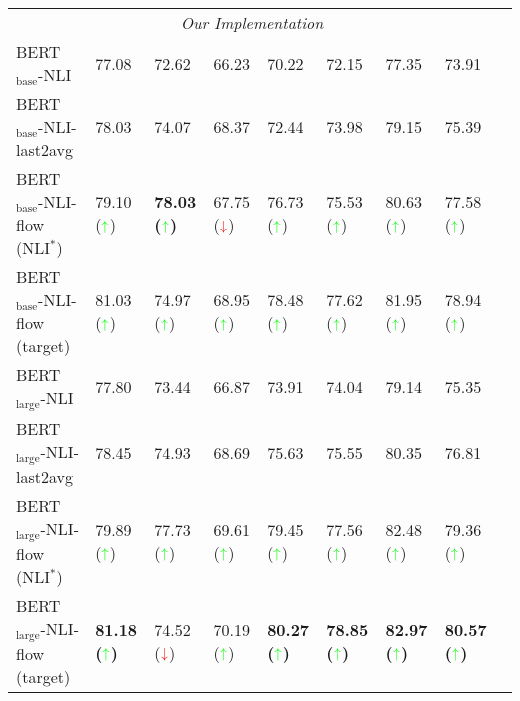 \documentclass[11pt,a4paper]{article}
\newcommand*{\mathcolor}{}
\def\mathcolor#1#{\mathcoloraux{#1}}
\newcommand*{\mathcoloraux}[3]{\protect\leavevmode
  \begingroup
    \color#1{#2}#3\endgroup
}
\begin{document}
\begin{table*}[ht]
\begin{center}
{\begin{tabular}{l llllllll}
\midrule\midrule
\multicolumn{8}{c}{\emph{Our Implementation}}  \\
BERT$_{\text{base}}$-NLI  & 77.08	& 72.62	& 66.23	& 70.22	& 72.15	& 77.35	& 73.91 \\
BERT$_{\text{base}}$-NLI-last2avg & 78.03	& 74.07	& 68.37	& 72.44	& 73.98	& 79.15	& 75.39 \\
BERT$_{\text{base}}$-NLI-flow (NLI$^*$)   & 79.10 ($\mathcolor{green}{\uparrow}$)	& \bf 78.03 ($\mathcolor{green}{\uparrow}$)	& 67.75 ($\mathcolor{red}{\downarrow}$)	& 76.73 ($\mathcolor{green}{\uparrow}$)	& 75.53 ($\mathcolor{green}{\uparrow}$)	& 80.63 ($\mathcolor{green}{\uparrow}$)	& 77.58 ($\mathcolor{green}{\uparrow}$) \\
BERT$_{\text{base}}$-NLI-flow (target) & 81.03 ($\mathcolor{green}{\uparrow}$)	& 74.97 ($\mathcolor{green}{\uparrow}$)	& 68.95 ($\mathcolor{green}{\uparrow}$)	& 78.48 ($\mathcolor{green}{\uparrow}$)	& 77.62 ($\mathcolor{green}{\uparrow}$)	& 81.95 ($\mathcolor{green}{\uparrow}$)	& 78.94 ($\mathcolor{green}{\uparrow}$) \\
\midrule
BERT$_{\text{large}}$-NLI & 77.80	& 73.44	& 66.87	& 73.91	& 74.04	& 79.14	& 75.35 \\
BERT$_{\text{large}}$-NLI-last2avg & 78.45	& 74.93	& 68.69	& 75.63	& 75.55	& 80.35	& 76.81 \\
BERT$_{\text{large}}$-NLI-flow (NLI$^*$) & 79.89  ($\mathcolor{green}{\uparrow}$)	& 77.73  ($\mathcolor{green}{\uparrow}$)	& 69.61  ($\mathcolor{green}{\uparrow}$)	& 79.45  ($\mathcolor{green}{\uparrow}$)	& 77.56  ($\mathcolor{green}{\uparrow}$)	& 82.48	  ($\mathcolor{green}{\uparrow}$) & 79.36  ($\mathcolor{green}{\uparrow}$) \\
BERT$_{\text{large}}$-NLI-flow (target) & \bf 81.18  ($\mathcolor{green}{\uparrow}$)	& 74.52 ($\mathcolor{red}{\downarrow}$)	&  70.19	 ($\mathcolor{green}{\uparrow}$) & \bf 80.27  ($\mathcolor{green}{\uparrow}$)	& \bf 78.85  ($\mathcolor{green}{\uparrow}$)	& \bf 82.97  ($\mathcolor{green}{\uparrow}$)	& \bf 80.57  ($\mathcolor{green}{\uparrow}$)\\



\end{tabular}}
\end{center}
\end{table*}
\end{document}
